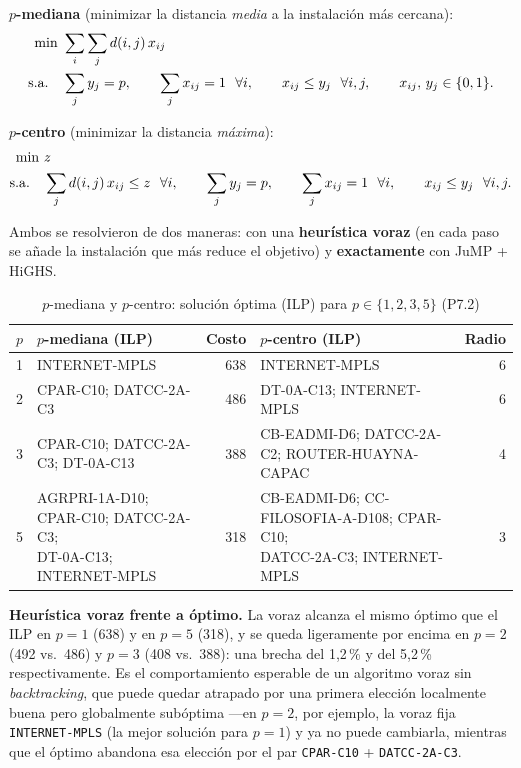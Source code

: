 \documentclass[10pt,a4paper]{extarticle}
\newcommand{\code}[1]{\texttt{\small #1}}
\begin{document}
\textbf{$p$-mediana} (minimizar la distancia \textit{media} a la instalación más cercana):
\begin{align}
\min\ & \sum_{i}\sum_{j} d(i,j)\, x_{ij} \\
\text{s.a.}\quad & \sum_j y_j = p, \qquad
\sum_j x_{ij} = 1\ \ \forall i, \qquad
x_{ij} \le y_j\ \ \forall i,j, \qquad
x_{ij},\, y_j \in \{0,1\}. \notag
\end{align}

\textbf{$p$-centro} (minimizar la distancia \textit{máxima}):
\begin{align}
\min\ & z \\
\text{s.a.}\quad & \sum_j d(i,j)\, x_{ij} \le z\ \ \forall i, \qquad
\sum_j y_j = p, \qquad
\sum_j x_{ij} = 1\ \ \forall i, \qquad
x_{ij} \le y_j\ \ \forall i,j. \notag
\end{align}

Ambos se resolvieron de dos maneras: con una \textbf{heurística voraz} (en cada paso se
añade la instalación que más reduce el objetivo) y \textbf{exactamente} con JuMP + HiGHS.

\begin{table}[H]
\centering
\caption{$p$-mediana y $p$-centro: solución óptima (ILP) para $p \in \{1,2,3,5\}$ (P7.2)}
\label{tab:localizacion}
\scriptsize
\begin{adjustbox}{max width=\textwidth}
\begin{tabular}{r|lr|lr}
\toprule
$p$ & \textbf{$p$-mediana (ILP)} & \textbf{Costo} & \textbf{$p$-centro (ILP)} & \textbf{Radio} \\
\midrule
1 & INTERNET-MPLS & 638 & INTERNET-MPLS & 6 \\
2 & CPAR-C10; DATCC-2A-C3 & 486 & DT-0A-C13; INTERNET-MPLS & 6 \\
3 & CPAR-C10; DATCC-2A-C3; DT-0A-C13 & 388 & CB-EADMI-D6; DATCC-2A-C2; ROUTER-HUAYNA-CAPAC & 4 \\
5 & \makecell[l]{AGRPRI-1A-D10; CPAR-C10; DATCC-2A-C3;\\ DT-0A-C13; INTERNET-MPLS} & 318 &
    \makecell[l]{CB-EADMI-D6; CC-FILOSOFIA-A-D108; CPAR-C10;\\ DATCC-2A-C3; INTERNET-MPLS} & 3 \\
\bottomrule
\end{tabular}
\end{adjustbox}
\end{table}

\textbf{Heurística voraz frente a óptimo.} La voraz alcanza el mismo óptimo que el ILP en
$p=1$ (638) y en $p=5$ (318), y se queda ligeramente por encima en $p=2$ (492 vs.\ 486) y
$p=3$ (408 vs.\ 388): una brecha del 1,2\,\% y del 5,2\,\% respectivamente. Es el
comportamiento esperable de un algoritmo voraz sin \textit{backtracking}, que puede quedar
atrapado por una primera elección localmente buena pero globalmente subóptima ---en $p=2$,
por ejemplo, la voraz fija \code{INTERNET-MPLS} (la mejor solución para $p=1$) y ya no puede
cambiarla, mientras que el óptimo abandona esa elección por el par
\code{CPAR-C10} + \code{DATCC-2A-C3}.
\end{document}

